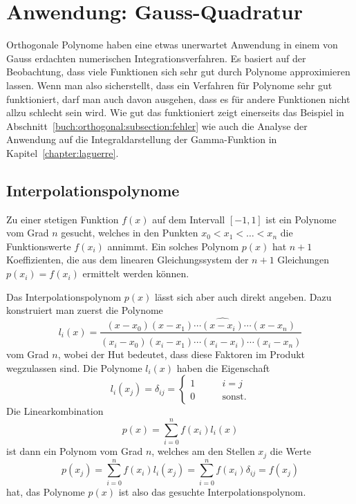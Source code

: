 %
%
\section{Anwendung: Gauss-Quadratur
\label{buch:orthogonal:section:gauss-quadratur}}
Orthogonale Polynome haben eine etwas unerwartet Anwendung in einem
von Gauss erdachten numerischen Integrationsverfahren.
Es basiert auf der Beobachtung, dass viele Funktionen sich sehr
gut durch Polynome approximieren lassen.
Wenn man also sicherstellt, dass ein Verfahren für Polynome
sehr gut funktioniert, darf man auch davon ausgehen, dass es für
andere Funktionen nicht allzu schlecht sein wird.
Wie gut das funktioniert zeigt einerseits das Beispiel in
Abschnitt~\ref{buch:orthogonal:subsection:fehler} wie
auch die Analyse der Anwendung auf die Integraldarstellung
der Gamma-Funktion in Kapitel~\ref{chapter:laguerre}.

%
%
\subsection{Interpolationspolynome
\label{buch:orthogonal:subsection:interpolationspolynome}}
Zu einer stetigen Funktion $f(x)$ auf dem Intervall $[-1,1]$ 
ist ein Polynome vom Grad $n$ gesucht, welches in den Punkten
$x_0<x_1<\dots<x_n$ die Funktionswerte $f(x_i)$ annimmt.
Ein solches Polynom $p(x)$ hat $n+1$ Koeffizienten, die aus dem
linearen Gleichungssystem der $n+1$ Gleichungen $p(x_i)=f(x_i)$ 
ermittelt werden können.

Das Interpolationspolynom $p(x)$ lässt sich aber auch direkt 
angeben.
Dazu konstruiert man zuerst die Polynome
\[
l_i(x)
=
\frac{
(x-x_0)(x-x_1)\cdots\widehat{(x-x_i)}\cdots (x-x_n)
}{
(x_i-x_0)(x_i-x_1)\cdots\widehat{(x_i-x_i)}\cdots (x_i-x_n)
}
\]
vom Grad $n$, wobei der Hut bedeutet, dass diese Faktoren
im Produkt wegzulassen sind.
Die Polynome $l_i(x)$ haben die Eigenschaft
\[
l_i(x_j) = \delta_{ij}
=
\begin{cases}
1&\qquad i=j\\
0&\qquad\text{sonst}.
\end{cases}
\]
Die Linearkombination
\[
p(x) = \sum_{i=0}^n f(x_i)l_i(x)
\]
ist dann ein Polynom vom Grad $n$, welches am den Stellen $x_j$
die Werte
\[
p(x_j) 
=
\sum_{i=0}^n f(x_i)l_i(x_j)
=
\sum_{i=0}^n f(x_i)\delta_{ij}
=
f(x_j)
\]
hat, das Polynome $p(x)$ ist also das gesuchte Interpolationspolynom.

%
%
